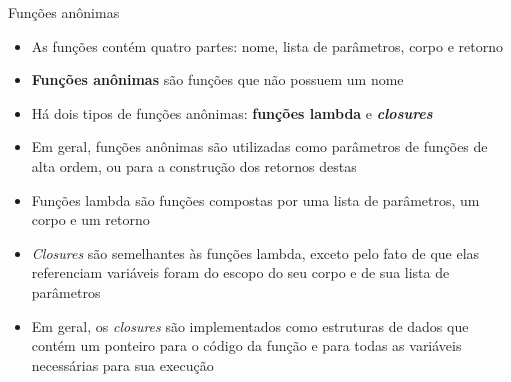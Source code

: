 \begin{frame}[fragile]{Funções anônimas}

    \begin{itemize}
        \item As funções contém quatro partes: nome, lista de parâmetros, corpo e retorno

        \item \textbf{Funções anônimas} são funções que não possuem um nome

        \item Há dois tipos de funções anônimas: \textbf{funções lambda} e 
            \textit{\textbf{closures}}

        \item Em geral, funções anônimas são utilizadas como parâmetros de funções de alta ordem,
            ou para a construção dos retornos destas

        \item Funções lambda são funções compostas por uma lista de parâmetros, um corpo e um
            retorno

        \item \textit{Closures} são semelhantes às funções lambda, exceto pelo fato de que elas
            referenciam variáveis foram do escopo do seu corpo e de sua lista de parâmetros

        \item Em geral, os \textit{closures} são implementados como estruturas de dados que
            contém um ponteiro para o código da função e para todas as variáveis necessárias para
            sua execução
    \end{itemize}

\end{frame}


